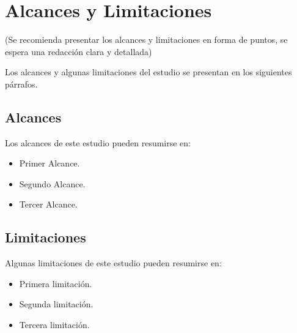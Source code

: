 \chapter{Alcances y Limitaciones}
(Se recomienda presentar los alcances y limitaciones en forma de puntos, se espera una redacción clara y detallada)

Los alcances y algunas limitaciones del estudio se presentan en los siguientes párrafos.

\section{Alcances}
Los alcances de este estudio pueden resumirse en:

 \begin{itemize}
 	\item Primer Alcance.
	\item Segundo Alcance.
	\item Tercer Alcance.
 \end{itemize}
\section{Limitaciones}

Algunas limitaciones de este estudio pueden resumirse en:

 \begin{itemize}
 	\item Primera limitación.
	\item Segunda limitación.
	\item Tercera limitación.
 \end{itemize}
 